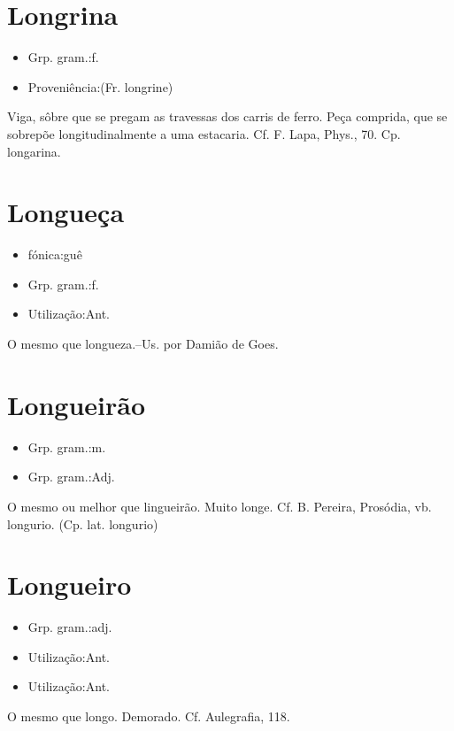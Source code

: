 \section{Longrina}
\begin{itemize}
\item {Grp. gram.:f.}
\end{itemize}
\begin{itemize}
\item {Proveniência:(Fr. \textunderscore longrine\textunderscore )}
\end{itemize}
Viga, sôbre que se pregam as travessas dos carris de ferro.
Peça comprida, que se sobrepõe longitudinalmente a uma estacaria. Cf. F. Lapa, \textunderscore Phys.\textunderscore , 70. Cp. \textunderscore longarina\textunderscore .
\section{Longueça}
\begin{itemize}
\item {fónica:guê}
\end{itemize}
\begin{itemize}
\item {Grp. gram.:f.}
\end{itemize}
\begin{itemize}
\item {Utilização:Ant.}
\end{itemize}
O mesmo que \textunderscore longueza\textunderscore .--Us. por Damião de Goes.
\section{Longueirão}
\begin{itemize}
\item {Grp. gram.:m.}
\end{itemize}
\begin{itemize}
\item {Grp. gram.:Adj.}
\end{itemize}
O mesmo ou melhor que \textunderscore lingueirão\textunderscore .
Muito longe. Cf. B. Pereira, Prosódia, vb. \textunderscore longurio\textunderscore .
(Cp. lat. \textunderscore longurio\textunderscore )
\section{Longueiro}
\begin{itemize}
\item {Grp. gram.:adj.}
\end{itemize}
\begin{itemize}
\item {Utilização:Ant.}
\end{itemize}
\begin{itemize}
\item {Utilização:Ant.}
\end{itemize}
O mesmo que \textunderscore longo\textunderscore .
Demorado. Cf. \textunderscore Aulegrafia\textunderscore , 118.
